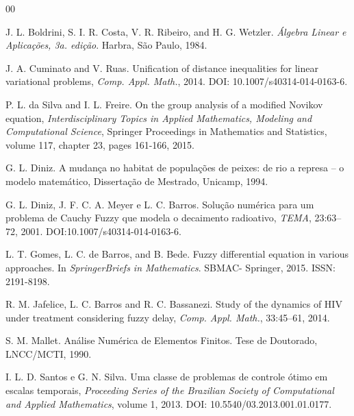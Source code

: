 \documentclass{enset}
\begin{document}
\begin{thebibliography}{00}

J. L. Boldrini, S. I. R. Costa, V. R. Ribeiro, and H. G. Wetzler. {\it Álgebra Linear e Aplicações, 3a. edição}. Harbra, São Paulo, 1984.

J. A. Cuminato and V. Ruas. Unification of distance inequalities for linear variational problems, 
{\it Comp. Appl. Math.}, 2014. DOI: 10.1007/s40314-014-0163-6.
 
P. L. da Silva and I. L. Freire. On the group analysis of a modified Novikov equation, 
{\it Interdisciplinary Topics in Applied Mathematics, Modeling and Computational Science}, 
Springer Proceedings in Mathematics and Statistics,  volume 117, chapter 23, pages 161-166, 2015.

G. L. Diniz. A mudança no habitat de populações de peixes: de rio a represa -- o modelo 
matemático, Dissertação de Mestrado, Unicamp, 1994.

G. L. Diniz, J. F. C. A. Meyer e L. C. Barros. Solução numérica para um problema de 
Cauchy Fuzzy que modela o decaimento radioativo, {\it TEMA},  23:63--72, 2001. DOI:10.1007/s40314-014-0163-6.

L. T. Gomes, L. C. de Barros, and B. Bede. Fuzzy differential equation in various approaches. 
In {\it SpringerBriefs in Mathematics}. SBMAC- Springer, 2015. ISSN: 2191-8198.

 R. M. Jafelice, L. C. Barros and R. C. Bassanezi. Study of the dynamics of HIV under 
treatment considering fuzzy delay, {\it Comp. Appl. Math.}, 33:45--61, 2014.

S. M. Mallet. Análise Numérica de Elementos Finitos. Tese de Doutorado, LNCC/MCTI, 1990.

 I. L. D. Santos e G. N. Silva. Uma classe de problemas de controle ótimo 
em escalas temporais, {\it Proceeding Series of the Brazilian Society of Computational and 
Applied Mathematics}, volume 1, 2013. DOI: 10.5540/03.2013.001.01.0177.

\end{thebibliography}
\end{document}
